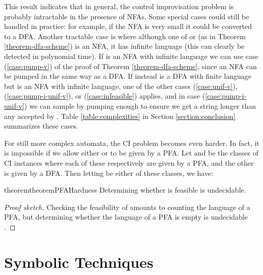\documentclass[a4paper,USenglish,numberwithinsect]{lipics}
\theoremstyle{plain}
\theoremstyle{definition}
\begin{document}
This result indicates that in general, the control improvisation
problem is probably intractable in the presence of NFAs. Some special
cases could still be handled in practice: for example, if the NFA is
very small it could be converted to a DFA. Another tractable case is
where although one of  or  (as
in Theorem \ref{theorem-dfa-scheme}) is an NFA, it has infinite
language (this can clearly be detected in polynomial time). If
 is an NFA with infinite language we can use case
(\ref{case:pump-v}) of the proof of Theorem \ref{theorem-dfa-scheme}, since an NFA
can be pumped in the same way as a DFA. If instead 
is a DFA with finite language but  is an NFA with
infinite language, one of the other cases (\ref{case:unif-v}),
(\ref{case:pump-i-unif-v}), or (\ref{case:infeasible}) applies, and in
case (\ref{case:pump-i-unif-v}) we can sample  by pumping  enough to ensure we get a
string longer than any accepted by . Table
\ref{table:complexities} in Section \ref{section:conclusion}
summarizes these cases. 

For still more complex automata, the CI problem becomes even
harder. In fact, it is impossible if we allow either
 or  to be given by a PFA. Let
 and  be the classes of CI instances
where each of these respectively are given by a PFA, and the other is
given by a DFA. Then letting  be either of these classes,
we have: 

\begin{restatable}{theorem}{theoremPFAHardness} \label{theorem:pfa-hardness}
Determining whether  is feasible is undecidable.
\end{restatable}
\begin{proof}[Proof sketch]
Checking the feasibility of  amounts to counting the language of a PFA, but determining whether the language of a PFA is empty is undecidable \cite{nasu-honda,condon-lipton}.
\end{proof}

\section{Symbolic Techniques} \label{section:symbolic}
\end{document}
